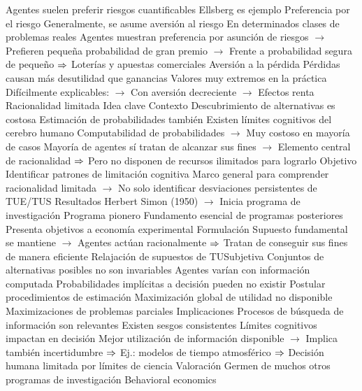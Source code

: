 \documentclass{nuevotema}
\begin{document}
\begin{esquemal}
				\4 Agentes suelen preferir riesgos cuantificables
				\4[$\then$] Ellsberg es ejemplo
			\3 Preferencia por el riesgo
				\4 Generalmente, se asume aversión al riesgo
				\4 En determinados clases de problemas reales
				\4[] Agentes muestran preferencia por asunción de riesgos
				\4[] $\to$ Prefieren pequeña probabilidad de gran premio
				\4[] $\to$ Frente a probabilidad segura de pequeño
				\4[] $\then$ Loterías y apuestas comerciales
			\3 Aversión a la pérdida
				\4 Pérdidas causan más desutilidad que ganancias
				\4 Valores muy extremos en la práctica
				\4[] Difícilmente explicables:
				\4[] $\to$ Con aversión decreciente
				\4[] $\to$ Efectos renta
		\2 Racionalidad limitada
			\3 Idea clave
				\4 Contexto
				\4[] Descubrimiento de alternativas es costosa
				\4[] Estimación de probabilidades también
				\4[] Existen límites cognitivos del cerebro humano
				\4[] Computabilidad de probabilidades
				\4[] $\to$ Muy costoso en mayoría de casos
				\4[] Mayoría de agentes sí tratan de alcanzar sus fines
				\4[] $\to$ Elemento central de racionalidad
				\4[] $\then$ Pero no disponen de recursos ilimitados para lograrlo
				\4 Objetivo
				\4[] Identificar patrones de limitación cognitiva
				\4[] Marco general para comprender racionalidad limitada
				\4[] $\to$ No solo identificar desviaciones persistentes de TUE/TUS
				\4 Resultados
				\4[] Herbert Simon (1950)
				\4[] $\to$ Inicia programa de investigación
				\4[] Programa pionero
				\4[] Fundamento esencial de programas posteriores
				\4[] Presenta objetivos a economía experimental
			\3 Formulación
				\4 Supuesto fundamental se mantiene
				\4[] $\to$ Agentes actúan racionalmente
				\4[] $\then$ Tratan de conseguir sus fines de manera eficiente
				\4 Relajación de supuestos de TUSubjetiva
				\4 Conjuntos de alternativas posibles no son invariables
				\4[] Agentes varían con información computada
				\4 Probabilidades implícitas a decisión pueden no existir
				\4[] Postular procedimientos de estimación
				\4 Maximización global de utilidad no disponible
				\4[] Maximizaciones de problemas parciales
			\3 Implicaciones
				\4 Procesos de búsqueda de información son relevantes
				\4[] Existen sesgos consistentes
				\4 Límites cognitivos impactan en decisión
				\4 Mejor utilización de información disponible
				\4[] $\to$ Implica también incertidumbre
				\4[] $\then$ Ej.: modelos de tiempo atmosférico
				\4[] $\then$ Decisión humana limitada por límites de ciencia
			\3 Valoración
				\4 Germen de muchos otros programas de investigación
				\4[] Behavioral economics

\end{esquemal}
\end{document}
